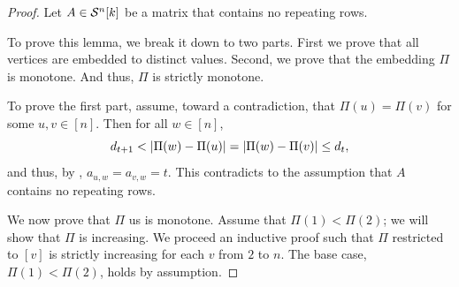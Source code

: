 \documentclass[runningheads]{llncs}
\begin{document}
\begin{proof}
Let $A\in\calS^n[k]$ be a matrix that contains no repeating rows. 

To prove this lemma, we break it down to two parts. 
First we prove that all vertices are embedded to distinct values.
Second, we prove that the embedding $\Pi$ is monotone. 
And thus, $\Pi$ is strictly monotone.

To prove the first part, assume, toward a contradiction, that $\Pi(u)=\Pi(v)$ for some $u,v\in [n]$. Then for all $w\in[n]$,
$$
   d_{t+1} < |\dist uw| = |\dist vw| \leq d_t,
$$
and thus, by , $a_{u,w} = a_{v,w} = t$.
This contradicts to the assumption that $A$ contains no repeating rows. 

We now prove that $\Pi$ us is monotone. Assume that $\Pi(1)<\Pi(2)$; we will show that $\Pi$ is increasing. 
We proceed an inductive proof such that $\Pi$ restricted to $[v]$ is strictly increasing for each $v$ from $2$ to $n$. 
The base case, $\Pi(1)<\Pi(2)$, holds by assumption.


\end{proof}
\end{document}
